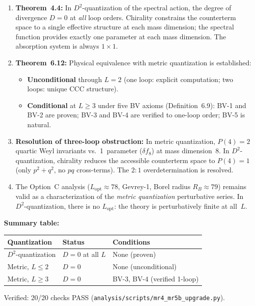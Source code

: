 \documentclass[12pt,a4paper]{article}
\begin{document}
\begin{enumerate}
  \item \textbf{Theorem~4.4:}
    In $D^2$-quantization of the spectral action, the degree of divergence
    $D = 0$ at \emph{all} loop orders.  Chirality constrains the counterterm
    space to a single effective structure at each mass dimension; the spectral
    function provides exactly one parameter at each mass dimension.  The
    absorption system is always $1 \times 1$.

  \item \textbf{Theorem~6.12:}
    Physical equivalence with metric quantization is established:
    \begin{itemize}
      \item \textbf{Unconditional} through $L = 2$ (one loop: explicit
        computation; two loops: unique CCC structure).
      \item \textbf{Conditional} at $L \geq 3$ under five BV axioms
        (Definition~6.9): BV-1 and BV-2 are proven; BV-3 and BV-4 are
        verified to one-loop order; BV-5 is natural.
    \end{itemize}

  \item \textbf{Resolution of three-loop obstruction:}
    In metric quantization, $P(4) = 2$ quartic Weyl invariants vs.\
    1~parameter ($\delta f_8$) at mass dimension~8.  In $D^2$-quantization,
    chirality reduces the accessible counterterm space to $P(4) = 1$
    (only $p^2 + q^2$, no $pq$ cross-terms).  The $2:1$ overdetermination
    is resolved.

  \item The Option~C analysis ($L_{\mathrm{opt}} \approx 78$, Gevrey-1,
    Borel radius $R_B \approx 79$) remains valid as a characterization
    of the \emph{metric quantization} perturbative series.  In
    $D^2$-quantization, there is no $L_{\mathrm{opt}}$: the theory is
    perturbatively finite at all~$L$.
\end{enumerate}

\medskip\noindent\textbf{Summary table:}

\begin{center}
\begin{tabular}{@{}lll@{}}
\toprule
Quantization & Status & Conditions \\
\midrule
$D^2$-quantization & $D = 0$ at all $L$ & None (proven) \\
Metric, $L \leq 2$ & $D = 0$ & None (unconditional) \\
Metric, $L \geq 3$ & $D = 0$ & BV-3, BV-4 (verified 1-loop) \\
\bottomrule
\end{tabular}
\end{center}

\noindent Verified: 20/20 checks PASS (\texttt{analysis/scripts/mr4\_mr5b\_upgrade.py}).
\end{document}
